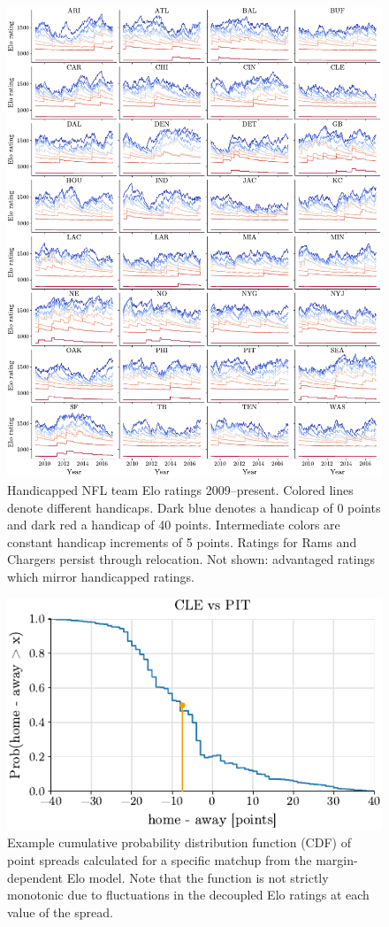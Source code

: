 \documentclass[aps,prc,reprint,amsmath,superscriptaddress]{revtex4-1}
\begin{document}
\begin{figure}
  \includegraphics{team_history}
  \caption{Handicapped NFL team Elo ratings 2009--present. Colored lines denote different handicaps. Dark blue denotes a handicap of 0 points and dark red a handicap of 40 points. Intermediate colors are constant handicap increments of 5 points. Ratings for Rams and Chargers persist through relocation. Not shown: advantaged ratings which mirror handicapped ratings.}
\end{figure}

\begin{figure}
  \includegraphics{example_distribution}
  \caption{Example cumulative probability distribution function (CDF) of point spreads calculated for a specific matchup from the margin-dependent Elo model. Note that the function is not strictly monotonic due to fluctuations in the decoupled Elo ratings at each value of the spread.}
\end{figure}
\end{document}
